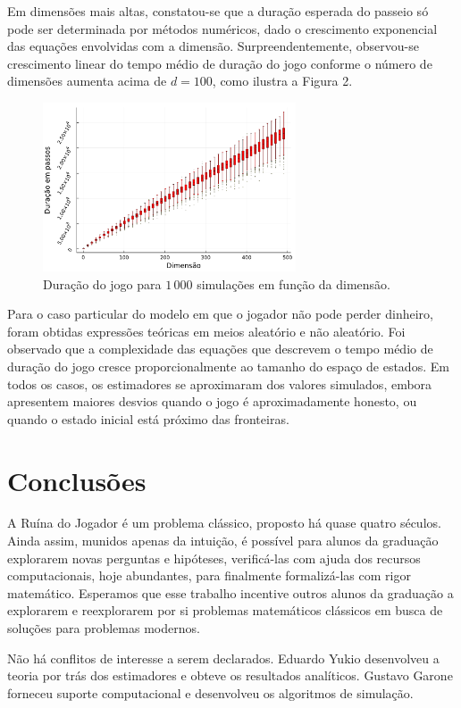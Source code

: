 \documentclass[a4paper,10pt,twocolumn]{article}
\begin{document}
Em dimensões mais altas, constatou-se que a duração esperada do passeio só pode
ser determinada por métodos numéricos, dado o crescimento exponencial das
equações envolvidas com a dimensão. Surpreendentemente, observou-se crescimento
linear do tempo médio de duração do jogo conforme o número de dimensões aumenta
acima de $d=100$, como ilustra a Figura 2.

\begin{figure}[h]
    \centering
    \includegraphics[width=7.5cm]{"boxplots.pdf"}
    \centering
    \caption{Duração do jogo para $1\, 000$ simulações em função da dimensão.}
\end{figure}

Para o caso particular do modelo em que o jogador não pode perder dinheiro,
foram obtidas expressões teóricas em meios aleatório e não aleatório. Foi
observado que a complexidade das equações que descrevem o tempo médio de duração
do jogo cresce proporcionalmente ao tamanho do espaço de estados. Em todos os
casos, os estimadores se aproximaram dos valores simulados, embora apresentem
maiores desvios quando o jogo é aproximadamente honesto, ou quando o estado
inicial está próximo das fronteiras.

\section{Conclusões}

A Ruína do Jogador é um problema clássico, proposto há quase quatro séculos.
Ainda assim, munidos apenas da intuição, é possível para alunos da graduação
explorarem novas perguntas e hipóteses, verificá-las com ajuda dos recursos
computacionais, hoje abundantes, para finalmente formalizá-las com rigor
matemático. Esperamos que esse trabalho incentive outros alunos da graduação a
explorarem e reexplorarem por si problemas matemáticos clássicos em busca de
soluções para problemas modernos.

Não há conflitos de interesse a serem declarados. Eduardo Yukio desenvolveu a
teoria por trás dos estimadores e obteve os resultados analíticos. Gustavo
Garone forneceu suporte computacional e desenvolveu os algoritmos de simulação.
\end{document}
